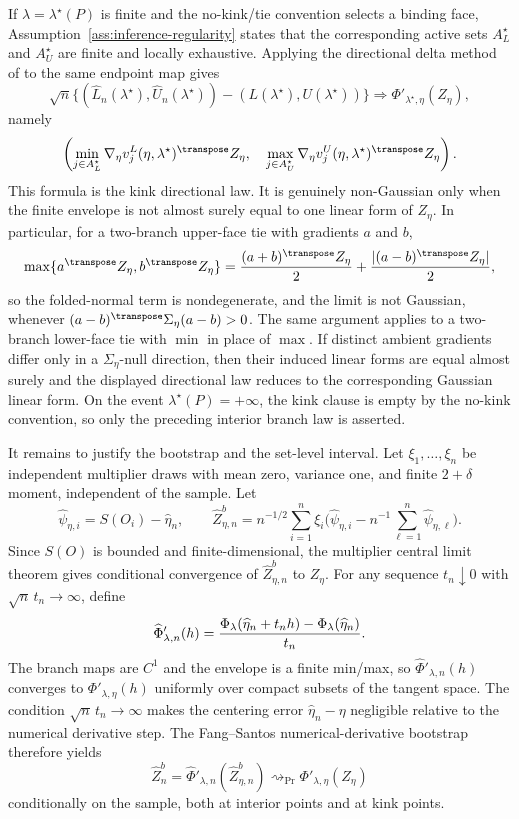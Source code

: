 If \(\lambda=\lambda^\star(P)\) is finite and the no-kink/tie convention selects a
binding face, Assumption~\ref{ass:inference-regularity} states that the corresponding active
sets \(A_L^\star\) and \(A_U^\star\) are finite and locally exhaustive.  Applying the
directional delta method of \citet{FangSantos2019DirectionallyDifferentiable} to the
same endpoint map gives
\[
  \sqrt n\{(\widehat L_n(\lambda^\star),\widehat U_n(\lambda^\star))
          -(L(\lambda^\star),U(\lambda^\star))\}
  \Rightarrow
  \Phi'_{\lambda^\star,\eta}(Z_\eta),
\]
namely
\[
  \left(
    \min_{j\in A_L^\star}
      \nabla_\eta v^L_j(\eta,\lambda^\star)^\transpose Z_\eta,\quad
    \max_{j\in A_U^\star}
      \nabla_\eta v^U_j(\eta,\lambda^\star)^\transpose Z_\eta
  \right).
\]
This formula is the kink directional law.  It is genuinely non-Gaussian only when the
finite envelope is not almost surely equal to one linear form of \(Z_\eta\).  In
particular, for a two-branch upper-face tie with gradients \(a\) and \(b\),
\[
  \max\{a^\transpose Z_\eta,b^\transpose Z_\eta\}
  =
  { (a+b)^\transpose Z_\eta \over 2}
  +
  { |(a-b)^\transpose Z_\eta| \over 2},
\]
so the folded-normal term is nondegenerate, and the limit is not Gaussian, whenever
\((a-b)^\transpose\Sigma_\eta(a-b)>0\).  The same argument applies to a two-branch
lower-face tie with \(\min\) in place of \(\max\).  If distinct ambient gradients
differ only in a \(\Sigma_\eta\)-null direction, then their induced linear forms are
equal almost surely and the displayed directional law reduces to the corresponding
Gaussian linear form.  On the event
\(\lambda^\star(P)=+\infty\), the kink clause is empty by the no-kink convention, so
only the preceding interior branch law is asserted.

It remains to justify the bootstrap and the set-level interval.  Let
\(\xi_1,\ldots,\xi_n\) be independent multiplier draws with mean zero, variance one,
and finite \(2+\delta\) moment, independent of the sample.  Let
\[
  \widehat\psi_{\eta,i}=S(O_i)-\widehat\eta_n,\qquad
  \widehat Z_{\eta,n}^b
  =
  n^{-1/2}\sum_{i=1}^n\xi_i
  \bigl(\widehat\psi_{\eta,i}-n^{-1}\sum_{\ell=1}^n\widehat\psi_{\eta,\ell}\bigr).
\]
Since \(S(O)\) is bounded and finite-dimensional, the multiplier central limit theorem
gives conditional convergence of \(\widehat Z_{\eta,n}^b\) to \(Z_\eta\).  For any
sequence \(t_n\downarrow0\) with \(\sqrt n\,t_n\to\infty\), define
\[
  \widehat\Phi'_{\lambda,n}(h)
  =
  { \Phi_\lambda(\widehat\eta_n+t_nh)-\Phi_\lambda(\widehat\eta_n)\over t_n}.
\]
The branch maps are \(C^1\) and the envelope is a finite min/max, so
\(\widehat\Phi'_{\lambda,n}(h)\) converges to
\(\Phi'_{\lambda,\eta}(h)\) uniformly over compact subsets of the tangent space.  The
condition \(\sqrt n\,t_n\to\infty\) makes the centering error
\(\widehat\eta_n-\eta\) negligible relative to the numerical derivative step.  The
Fang--Santos numerical-derivative bootstrap therefore yields
\[
  \widehat Z_n^b
  =
  \widehat\Phi'_{\lambda,n}(\widehat Z_{\eta,n}^b)
  \rightsquigarrow_{\Pr}
  \Phi'_{\lambda,\eta}(Z_\eta)
\]
conditionally on the sample, both at interior points and at kink points.

